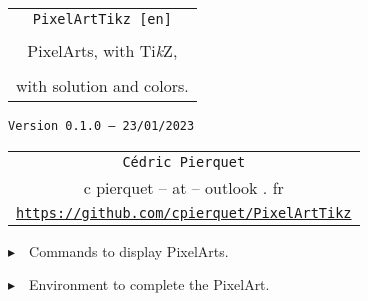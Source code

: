 \documentclass{article}
\def\TPversion{0.1.0}
\def\TPdate{23/01/2023}
\begin{document}
\pagestyle{fancy}

\thispagestyle{empty}

\vspace{2cm}

\begin{center}
	\begin{minipage}{0.75\linewidth}
	\begin{tcolorbox}[colframe=yellow,colback=yellow!15]
		\begin{center}
			\begin{tabular}{c}
				{\Huge \texttt{PixelArtTikz [en]}}\\
				\\
				{\LARGE PixelArts, with Ti\textit{k}Z}, \\
				\\
				{\LARGE with solution and colors.} \\
			\end{tabular}
			
			\medskip
			
			{\small \texttt{Version \TPversion{} -- \TPdate}}
		\end{center}
	\end{tcolorbox}
\end{minipage}
\end{center}

\vspace{0.5cm}

\begin{center}
	\begin{tabular}{c}
	\texttt{Cédric Pierquet}\\
	{\ttfamily c pierquet -- at -- outlook . fr}\\
	\texttt{\url{https://github.com/cpierquet/PixelArtTikz}}
\end{tabular}
\end{center}

\vspace{0.25cm}

{$\blacktriangleright$~~Commands to display PixelArts.}

\smallskip

{$\blacktriangleright$~~Environment to complete the PixelArt.}

\smallskip

\vspace{1cm}
\end{document}
